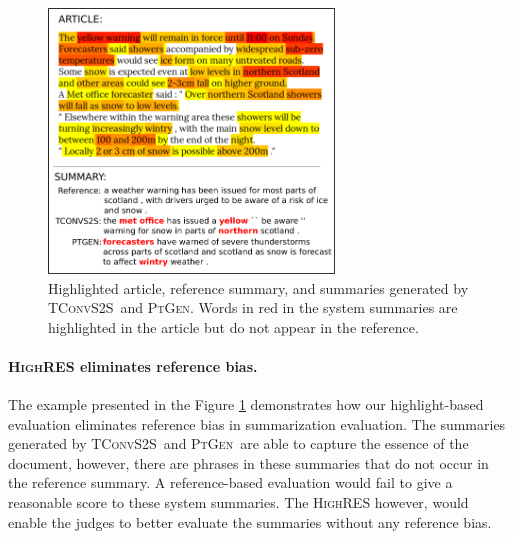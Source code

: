 \documentclass[11pt,a4paper]{article}
\newcommand\highres{\textsc{HighRES}}
\newcommand\ptgen{\textsc{PtGen}}
\newcommand\tconv{\textsc{TConvS2S}}
\begin{document}
\begin{figure}[h]
    \centering
    \includegraphics[width=7.6cm]{heatmap_summ_small_2}
    \caption{Highlighted article, reference summary, and summaries generated by \tconv\ and \ptgen. Words in red in the system summaries are highlighted in the article but do not appear in the reference.}
  \label{image:heatmap_small_2}
\end{figure}

\paragraph{\highres{} eliminates reference bias.}
The example presented in the Figure \ref{image:heatmap_small_2} demonstrates how our highlight-based evaluation eliminates reference bias in summarization evaluation. The summaries generated by \tconv\ and \ptgen\ are able to capture the essence of the document, however, there are phrases in these summaries that do not occur in the reference summary. A reference-based evaluation would fail to give a reasonable score to these system summaries. The \highres{} however, would enable the judges to better evaluate the summaries without any reference bias.
\end{document}
